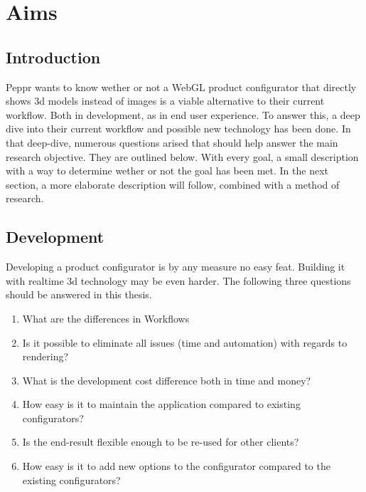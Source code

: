 \chapter{Aims}
\section{Introduction}
Peppr wants to know wether or not a WebGL product configurator that directly shows 3d models instead of images is a viable alternative to their current workflow. Both in development, as in end user experience. To answer this, a deep dive into their current workflow and possible new technology has been done. In that deep-dive, numerous questions arised that should help answer the main research objective. They are outlined below. With every goal, a small description with a way to determine wether or not the goal has been met. In the next section, a more elaborate description will follow, combined with a method of research.
\section{Development}
Developing a product configurator is by any measure no easy feat. Building it with realtime 3d technology may be even harder. The following three questions should be answered in this thesis.
​\begin{enumerate}
\item {What are the differences in Workflows}
\item {Is it possible to eliminate all issues (time and automation) with regards to rendering?}
\item {What is the development cost difference both in time and money?}
\item {How easy is it to maintain the application compared to existing configurators?}
\item {Is the end-result flexible enough to be re-used for other clients?}
\item {How easy is it to add new options to the configurator compared to the existing configurators?}
\end{enumerate}

